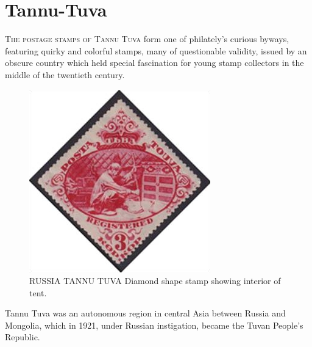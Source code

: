 \chapter{Tannu-Tuva}

\lettrine{T}{he postage stamps of Tannu Tuva} form one of philately's curious byways, featuring quirky and colorful stamps, many of questionable validity, issued by an obscure country which held special fascination for young stamp collectors in the middle of the twentieth century.

\begin{figure}[htp]
\centering
\includegraphics[width=.35\textwidth]{../tannu-tuva/interior-of-tent.jpg}
\caption{RUSSIA TANNU TUVA Diamond shape stamp showing interior of tent.}
\end{figure}


Tannu Tuva was an autonomous region in central Asia between Russia and Mongolia, which in 1921, under Russian instigation, became the Tuvan People's Republic. 



